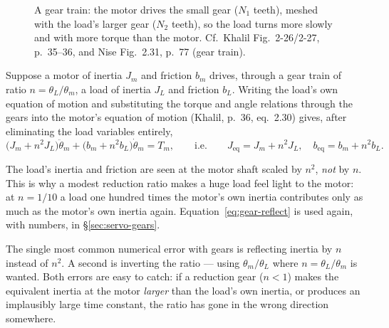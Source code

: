 \documentclass[11pt,a4paper]{article}
\begin{document}
\begin{figure}[htbp]
\centering
{}
\caption{A gear train: the motor drives the small gear ($N_1$ teeth), meshed
with the load's larger gear ($N_2$ teeth), so the load turns more slowly and
with more torque than the motor. Cf.\ Khalil Fig.~2-26/2-27, p.~35--36, and
Nise Fig.~2.31, p.~77 (gear train).}
\label{fig:gears}
\end{figure}

Suppose a motor of inertia $J_m$ and friction $b_m$ drives, through a gear
train of ratio $n=\theta_L/\theta_m$, a load of inertia $J_L$ and friction
$b_L$. Writing the load's own equation of motion and substituting the
torque and angle relations through the gears into the motor's equation of
motion (Khalil, p.~36, eq.~2.30) gives, after eliminating the load variables
entirely,
\begin{equation}
  \big(J_m+n^2J_L\big)\ddot\theta_m + \big(b_m+n^2b_L\big)\dot\theta_m = T_m,
  \qquad\text{i.e.}\qquad
  J_{\text{eq}}=J_m+n^2J_L,\quad b_{\text{eq}}=b_m+n^2b_L .
  \label{eq:gear-reflect}
\end{equation}

\begin{keyidea}
The load's inertia and friction are seen at the motor shaft scaled by
$n^2$, \emph{not} by $n$. This is why a modest reduction ratio makes a huge
load feel light to the motor: at $n=1/10$ a load one hundred times the motor's
own inertia contributes only as much as the motor's own inertia again.
Equation~\eqref{eq:gear-reflect} is used again, with numbers, in
\S\ref{sec:servo-gears}.
\end{keyidea}

\begin{pitfall}
The single most common numerical error with gears is reflecting inertia by $n$
instead of $n^2$. A second is inverting the ratio --- using $\theta_m/\theta_L$
where $n=\theta_L/\theta_m$ is wanted. Both errors are easy to catch: if a
reduction gear ($n<1$) makes the equivalent inertia at the motor \emph{larger}
than the load's own inertia, or produces an implausibly large time constant,
the ratio has gone in the wrong direction somewhere.
\end{pitfall}
\end{document}
